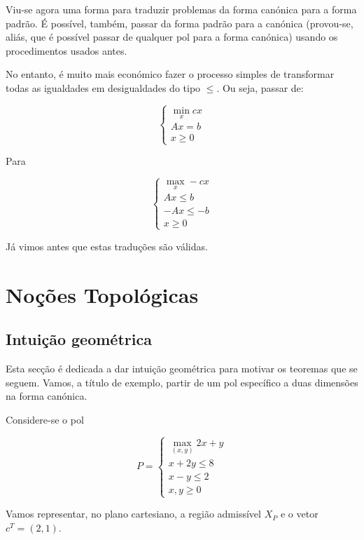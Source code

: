 \documentclass{article}
\theoremstyle{definition}
\begin{document}
	Viu-se agora uma forma para traduzir problemas da forma canónica para a forma padrão. É possível, também, passar da forma padrão para a canónica (provou-se, aliás, que é possível passar de qualquer pol para a forma canónica) usando os procedimentos usados antes.
	
	No entanto, é muito mais económico fazer o processo simples de transformar todas as igualdades em desigualdades do tipo $\leq$. Ou seja, passar de:
	
	\[
	\begin{cases}
	\min\limits_x cx\\
	Ax = b\\
	x \geq 0
	\end{cases}
	\]
	
	Para
	
	\[
	\begin{cases}
	\max\limits_x -cx\\
	Ax \leq b\\
	-Ax \leq -b\\
	x \geq 0
	\end{cases}
	\]
	
	Já vimos antes que estas traduções são válidas.
	
	\section{Noções Topológicas}
	
	\subsection{Intuição geométrica}
	
	Esta secção é dedicada a dar intuição geométrica para motivar os teoremas que se seguem. Vamos, a título de exemplo, partir de um pol específico a duas dimensões na forma canónica.
	
	Considere-se o pol
	
	\[
	P =
	\begin{cases}
	\max\limits_{(x,y)} 2x + y\\
	x + 2y \leq 8\\
	x - y \leq 2 \\
	x, y \geq 0
	\end{cases}
	\]
	
	Vamos representar, no plano cartesiano, a região admissível $X_P$ e o vetor $c^T = (2,1)$.
	
	
\end{document}
